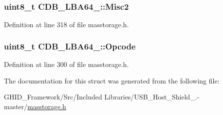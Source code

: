 \hypertarget{struct_c_d_b___l_b_a64__16_a9a71353cc6ecb838dfd560a3c985e4a6}{
\subsubsection[{\-Misc2}]{\setlength{\rightskip}{0pt plus 5cm}uint8\-\_\-t {\bf \-C\-D\-B\-\_\-\-L\-B\-A64\-\_\-::\-Misc2}}}\label{struct_c_d_b___l_b_a64__16_a9a71353cc6ecb838dfd560a3c985e4a6}


\-Definition at line 318 of file masstorage.\-h.

\hypertarget{struct_c_d_b___l_b_a64__16_a20868e9b945a51e146af8a31cad92977}{
\subsubsection[{\-Opcode}]{\setlength{\rightskip}{0pt plus 5cm}uint8\-\_\-t {\bf \-C\-D\-B\-\_\-\-L\-B\-A64\-\_\-::\-Opcode}}}\label{struct_c_d_b___l_b_a64__16_a20868e9b945a51e146af8a31cad92977}


\-Definition at line 300 of file masstorage.\-h.



\-The documentation for this struct was generated from the following file\-:\begin{DoxyCompactItemize}
\item 
\-G\-H\-I\-D\-\_\-\-Framework/\-Src/\-Included Libraries/\-U\-S\-B\-\_\-\-Host\-\_\-\-Shield\-\_.-\/master/\hyperlink{masstorage_8h}{masstorage.\-h}\end{DoxyCompactItemize}

